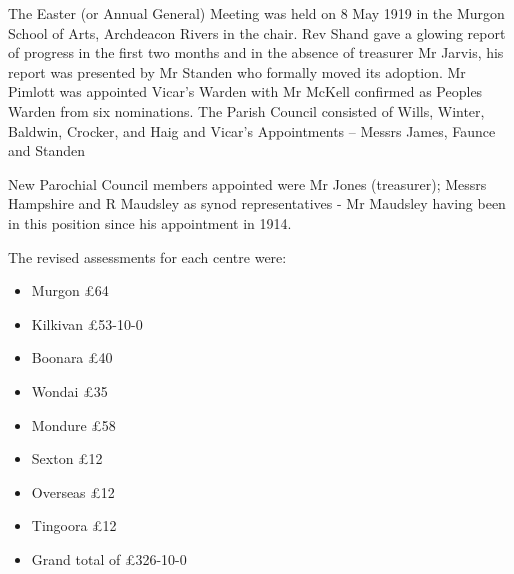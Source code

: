 The Easter (or Annual General) Meeting was held on 8 May 1919 in the Murgon School of Arts, Archdeacon Rivers in the chair. Rev Shand gave a glowing report of progress in the first two months and in the absence of treasurer Mr Jarvis, his report was presented by Mr Standen who formally moved its adoption. Mr Pimlott was appointed Vicar's Warden with Mr McKell confirmed as Peoples Warden from six nominations. The Parish Council consisted of Wills, Winter, Baldwin, Crocker, and Haig and Vicar's Appointments -- Messrs James, Faunce and Standen



New Parochial Council members appointed were Mr Jones (treasurer); Messrs Hampshire and R Maudsley as synod representatives - Mr Maudsley having been in this position since his appointment in 1914.



The revised assessments for each centre were:



\begin{itemize}

\item

  Murgon \pounds64

\item

  Kilkivan \pounds53-10-0

\item

  Boonara \pounds40

\item

  Wondai \pounds35

\item

  Mondure \pounds58

\item

  Sexton \pounds12

\item

  Overseas \pounds12

\item

  Tingoora \pounds12

\item

  Grand total of \pounds326-10-0

\end{itemize}



